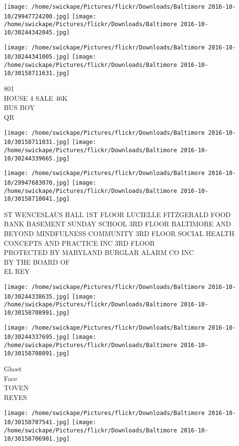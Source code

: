 \documentclass[10pt,letterpaper]{article}
\begin{document}
\texttt{[image: /home/swickape/Pictures/flickr/Downloads/Baltimore 2016-10-10/29947724200.jpg]}
\texttt{[image: /home/swickape/Pictures/flickr/Downloads/Baltimore 2016-10-10/30244342045.jpg]}

\texttt{[image: /home/swickape/Pictures/flickr/Downloads/Baltimore 2016-10-10/30244341005.jpg]}
\texttt{[image: /home/swickape/Pictures/flickr/Downloads/Baltimore 2016-10-10/30158711631.jpg]}

801\\
HOUSE 4 SALE 46K\\
BUS BOY\\
QR\\
\pagebreak

\texttt{[image: /home/swickape/Pictures/flickr/Downloads/Baltimore 2016-10-10/30158711031.jpg]}
\texttt{[image: /home/swickape/Pictures/flickr/Downloads/Baltimore 2016-10-10/30244339665.jpg]}

\texttt{[image: /home/swickape/Pictures/flickr/Downloads/Baltimore 2016-10-10/29947683070.jpg]}
\texttt{[image: /home/swickape/Pictures/flickr/Downloads/Baltimore 2016-10-10/30158710041.jpg]}

ST WENCESLAUS HALL 1ST FLOOR LUCIELLE FITZGERALD FOOD BANK BASEMENT SUNDAY SCHOOL 3RD FLOOR BALTIMORE AND BEYOND MINDFULNESS COMMUNITY 3RD FLOOR SOCIAL HEALTH CONCEPTS AND PRACTICE INC 3RD FLOOR\\
PROTECTED BY MARYLAND BURGLAR ALARM CO INC\\
BY THE BOARD OF\\
EL REY\\
\pagebreak

\texttt{[image: /home/swickape/Pictures/flickr/Downloads/Baltimore 2016-10-10/30244338635.jpg]}
\texttt{[image: /home/swickape/Pictures/flickr/Downloads/Baltimore 2016-10-10/30158708991.jpg]}

\texttt{[image: /home/swickape/Pictures/flickr/Downloads/Baltimore 2016-10-10/30244337695.jpg]}
\texttt{[image: /home/swickape/Pictures/flickr/Downloads/Baltimore 2016-10-10/30158708091.jpg]}

Ghost\\
Face\\
TOVEN\\
REYES\\
\pagebreak

\texttt{[image: /home/swickape/Pictures/flickr/Downloads/Baltimore 2016-10-10/30158707541.jpg]}
\texttt{[image: /home/swickape/Pictures/flickr/Downloads/Baltimore 2016-10-10/30158706901.jpg]}
\end{document}

